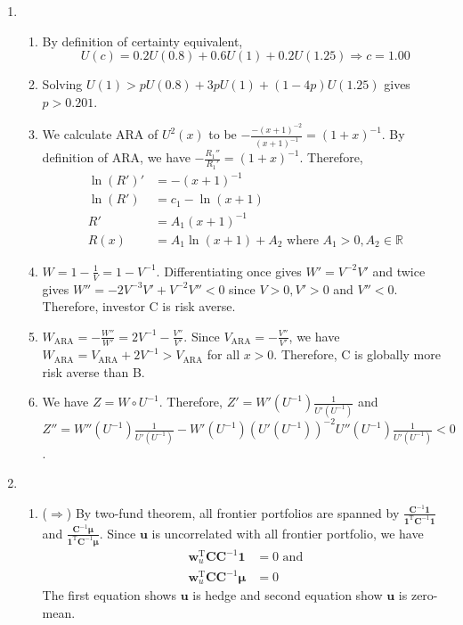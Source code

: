 \documentclass[12pt]{article}
\theoremstyle{definition}
\begin{document}
\begin{enumerate}
  \item \begin{enumerate} %
    \item By definition of certainty equivalent, 
    \[
U(c)=0.2U(0.8)+0.6U(1)+0.2U(1.25)\Rightarrow c=1.00
    \]
    \item Solving $U(1)>pU(0.8)+3pU(1)+(1-4p)U(1.25)$ gives $p > 0.201$.
    \item We calculate ARA of $U^2(x)$ to be $-\frac{-(x+1)^{-2}}{(x+1)^{-1}}=(1+x)^{-1}$.
    By definition of ARA, we have $-\frac{R_1''}{R_1'}=(1+x)^{-1}$. Therefore,
    \begin{align*}
    \ln(R')'&=-(x+1)^{-1}\\
    \ln(R')&=c_1-\ln(x+1)\\
    R'&=A_1(x+1)^{-1}\\
    R(x)&=A_1\ln(x+1)+A_2 \text{ where }A_1>0, A_2\in\mathbb{R}
    \end{align*}
    \item $W=1-\frac{1}{V}=1-V^{-1}$. Differentiating once gives $W'=V^{-2}V'$ and twice gives $W''=-2V^{-3}V'+V^{-2}V''<0$ since $V>0, V'>0$ and $V''<0$. Therefore, investor C is risk averse.
    \item $W_\text{ARA}=-\frac{W''}{W'}=2V^{-1}-\frac{V''}{V'}$. Since $V_\text{ARA}=-\frac{V''}{V'}$, we have $W_\text{ARA}=V_\text{ARA}+2V^{-1}>V_\text{ARA}$ for all $x>0$. Therefore, C is globally more risk averse than B.
    \item We have $Z=W\circ U^{-1}$. Therefore, $Z'=W'(U^{-1})\frac{1}{U'(U^{-1})}$ and $Z''=W''(U^{-1})\frac{1}{U'(U^{-1})}-W'(U^{-1})(U'(U^{-1}))^{-2}U''(U^{-1})\frac{1}{U'(U^{-1})}<0$.
  \end{enumerate}
  \item \begin{enumerate}
    \item ($\Rightarrow$) By two-fund theorem, all frontier portfolios are spanned by $\frac{\mathbf{C}^{-1}\mathbf{1}}{\mathbf{1}^\text{T}\mathbf{C}^{-1}\mathbf{1}}$ and $\frac{\mathbf{C}^{-1}\bm{\mu}}{\mathbf{1}^\text{T}\mathbf{C}^{-1}\bm{\mu}}$. Since $\mathbf{u}$ is uncorrelated with all frontier portfolio, we have
    \begin{align*}
    \mathbf{w}_u^\text{T}\mathbf{C}\mathbf{C}^{-1}\mathbf{1}&=0\text{ and}\\
    \mathbf{w}_u^\text{T}\mathbf{C}\mathbf{C}^{-1}\bm{\mu}&=0
    \end{align*} 
    The first equation shows $\mathbf{u}$ is hedge and second equation show $\mathbf{u}$ is zero-mean.\\

\end{enumerate}
\end{enumerate}
\end{document}

